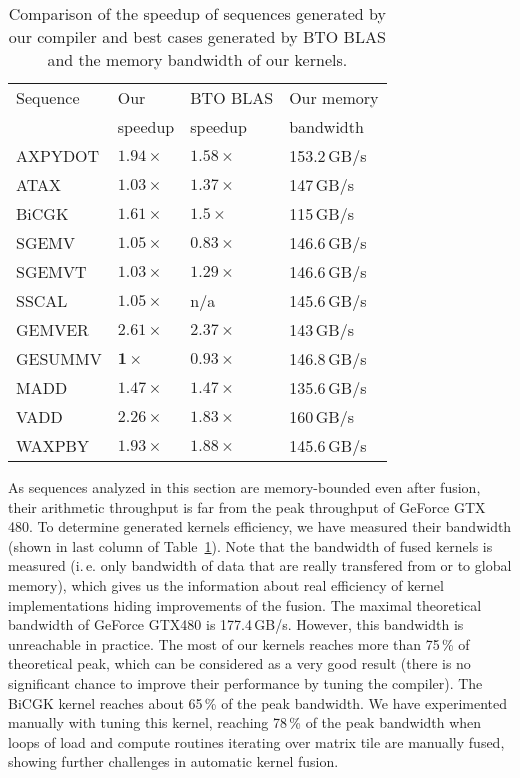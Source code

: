 \documentclass[final]{siamltex}
\def\ie{i.\,e.}
\begin{document}
{\begin{table}
        \centering
        \small
        \begin{tabular}{|l|l|l|l|}
                \hline
                Sequence & Our     & BTO BLAS & Our memory\\
                         & speedup & speedup  & bandwidth\\
                \hline
                AXPYDOT & $\mathbf{1.94\times}$ & $1.58\times$ & 153.2\,GB/s\\
                ATAX & $1.03\times$ & $\mathbf{1.37\times}$ & 147\,GB/s\\
                BiCGK & $\mathbf{1.61\times}$ & $1.5\times$ & 115\,GB/s\\
                SGEMV & $\mathbf{1.05\times}$ & $0.83\times$ & 146.6\,GB/s\\
                SGEMVT & $1.03\times$ & $\mathbf{1.29\times}$ & 146.6\,GB/s\\
                SSCAL & $1.05\times$ & n/a & 145.6\,GB/s\\
                GEMVER & $\mathbf{2.61\times}$ & $2.37\times$ & 143\,GB/s\\
                GESUMMV & $\mathbf{1\times}$ & $0.93\times$ & 146.8\,GB/s\\
                MADD & $1.47\times$ & $1.47\times$ & 135.6\,GB/s\\
                VADD & $\mathbf{2.26\times}$ & $1.83\times$ & 160\,GB/s\\
                WAXPBY & $\mathbf{1.93\times}$ & $1.88\times$ & 145.6\,GB/s\\
                \hline
        \end{tabular}
        \caption{Comparison of the speedup of sequences generated by our compiler and best cases generated by BTO BLAS and the memory bandwidth of our kernels.}
        \label{tab:fublas_comp}
\end{table}

As sequences analyzed in this section are memory-bounded even after fusion, their arithmetic throughput is far from the peak throughput of GeForce GTX 480. To determine generated kernels efficiency, we have measured their bandwidth (shown in last column of Table~\ref{tab:fublas_comp}). Note that the bandwidth of fused kernels is measured (\ie{} only bandwidth of data that are really transfered from or to global memory), which gives us the information about real efficiency of kernel implementations hiding improvements of the fusion. The maximal theoretical bandwidth of GeForce GTX480 is 177.4\,GB/s. However, this bandwidth is unreachable in practice. The most of our kernels reaches more than 75\,\% of theoretical peak, which can be considered as a very good result (there is no significant chance to improve their performance by tuning the compiler). The BiCGK kernel reaches about 65\,\% of the peak bandwidth. We have experimented manually with tuning this kernel, reaching 78\,\% of the peak bandwidth when loops of load and compute routines iterating over matrix tile are manually fused, showing further challenges in automatic kernel fusion.

}
\end{document}

